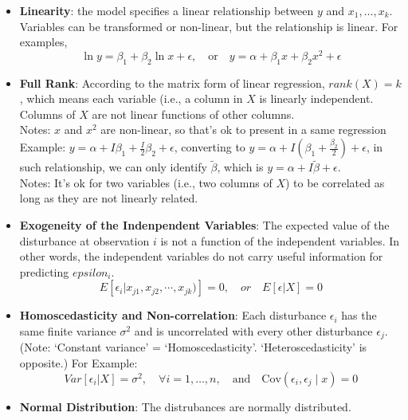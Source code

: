 \documentclass[11pt]{article}
\begin{document}
\begin{itemize}
    \item \textbf{Linearity}: the model specifies a linear relationship between $y$ and $x_1, \dots, x_k$.
    Variables can be transformed or non-linear, but the relationship is linear. For examples,
    \[
    \ln y = \beta_1 + \beta_2 \ln x + \epsilon,\quad \text{or} \quad y = \alpha + \beta_1 x + \beta_2 x^2 + \epsilon
    \] 

    \item \textbf{Full Rank}: According to the matrix form of linear regression, $rank(X) = k$, which means each variable 
    (i.e., a column in $X$ is linearly independent. Columns of $X$ are not linear functions of other columns. \\
        \hspace{1cm} Notes: $x$ and $x^2$ are non-linear, so that's ok to present in a same regression \\
        \hspace{1cm} Example: $y = \alpha + I\beta_1 + \frac{I}{2}\beta_2 + \epsilon$, converting to $y = \alpha + I(\beta_1+\frac{\beta_2}{2})+\epsilon$,
        in such relationship, we can only identify $\tilde{\beta}$, which is $y = \alpha + I\tilde{\beta}+\epsilon$. \\
        \hspace{1cm} Notes: It's ok for two variables (i.e., two columns of $X$) to be correlated as long as they are not linearly related.
        
    \item \textbf{Exogeneity of the Indenpendent Variables}: The expected value of the disturbance at observation $i$ 
    is not a function of the independent variables. In other words, the independent variables do not carry useful information for predicting $epsilon_i$. \\
    \[
    E[\epsilon_i|x_{j1}, x_{j2}, \cdots, x_{jk})] = 0, \quad or \quad E[\epsilon|X] = 0
    \]

    \item \textbf{Homoscedasticity and Non-correlation}: Each disturbance $\epsilon_i$ has the same finite variance $\sigma^2$ and is uncorrelated with
    every other disturbance $\epsilon_j$. (Note: `Constant variance' = `Homoscedasticity'. `Heteroscedasticity' is opposite.) For Example:
    \[
       Var[\epsilon_i|X] = \sigma^2, \quad \forall i = 1, \dots, n, \quad \text{and} \quad \text{Cov}\left(\epsilon_i, \epsilon_j \mid x \right) = 0
        \]

    \item \textbf{Normal Distribution}: The distrubances are normally distributed. 

\end{itemize}
\end{document}
